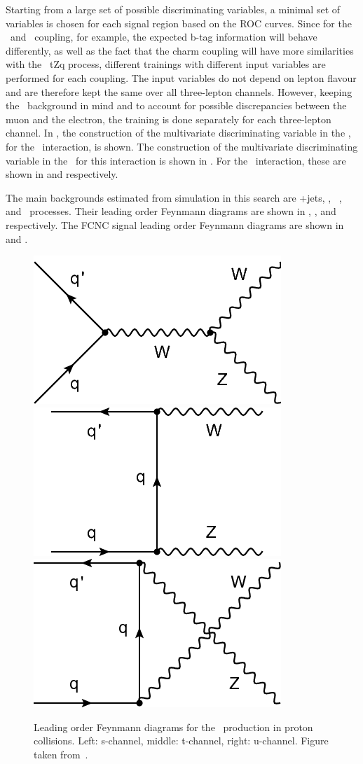 Starting from a large set of possible discriminating variables, a minimal set of variables is chosen for each signal region based on the ROC curves. Since for the \Zut\ and \Zct\ coupling, for example, the expected b-tag information will behave differently, as well as the fact that the charm coupling will have more similarities with the \SM\ tZq process, different trainings with different input variables are performed for each coupling.  The input variables do not depend on lepton flavour and are therefore kept the same over all three-lepton channels. However, keeping the \NPL\ background in mind and to account for possible discrepancies between the muon and the electron, the training is done separately for each three-lepton channel. In , the construction of the multivariate discriminating variable in the \STSR, for the \Zut\ interaction, is shown. The construction of the multivariate discriminating variable in the \TTSR\ for this interaction is shown in . For the \Zct\ interaction, these are shown in  and  respectively. 

The main backgrounds estimated from simulation in this search are \WZ+jets, \ttZ, \SM\ \tZq, and \ZZ\ processes. Their leading order Feynmann diagrams are shown in ,  ,  and  respectively. The FCNC signal leading order Feynmann diagrams are shown in  and . 
\begin{figure}[htbp]
	\centering
	\includegraphics[width=0.3\linewidth]{6_Search/Figures/Feynman/WZa}
	\includegraphics[width=0.3\linewidth]{6_Search/Figures/Feynman/WZb}
	\includegraphics[width=0.3\linewidth]{6_Search/Figures/Feynman/WZc}
	\caption{Leading order Feynmann diagrams for the \WZ\ production in proton collisions. Left: s-channel, middle: t-channel, right: u-channel. Figure taken from~\cite{Khachatryan:2216557}.}
	\label{fig:WZ}
\end{figure}

